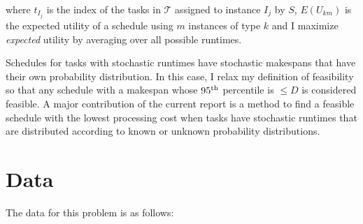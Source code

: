 \documentclass[12pt]{report}
\begin{document}
where $t_{I_j}$ is the index of the tasks in $\mathcal{T}$ assigned to instance $I_j$ by $S$, $E(U_{km})$ is the expected utility of a schedule using $m$ instances of type $k$ and I maximize \textit{expected} utility by averaging over all possible runtimes.

Schedules for tasks with stochastic runtimes have stochastic makespans that have their own probability distribution. 
In this case, I relax my definition of feasibility so that any schedule with a makespan whose $95\textsuperscript{th}$ percentile is $\le D$ is considered feasible. 
A major contribution of the current report is a method to find a feasible schedule with the lowest processing cost when tasks have stochastic runtimes that are distributed according to known or unknown probability distributions.

\section{Data}

\label{Data}
The data for this problem is as follows:
\end{document}
